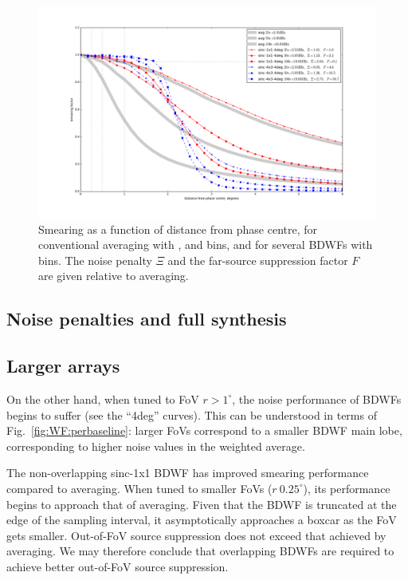\documentclass[useAMS,usenatbib]{mn2e}
\begin{document}
\begin{figure}
\includegraphics[width=\textwidth]{./Figures/suppression-25-100-sincs.png}
\caption{Smearing as a function of distance from phase centre, for conventional averaging with 
,  and  bins, and for several BDWFs with  bins.
The noise penalty $\Xi$ and the far-source suppression factor $F$ are given relative to 
averaging.}
\label{fig:results-3sincs}
\end{figure}





\subsection{Noise penalties and full synthesis}



\subsection{Larger arrays}




On the other hand, when tuned to FoV $r>1^\circ$, the noise performance of BDWFs begins to suffer (see the ``4deg'' 
curves). This can be understood in terms of Fig.~\ref{fig:WF:perbaseline}: larger FoVs correspond to a smaller BDWF 
main lobe, corresponding to higher noise values in the weighted average.

The non-overlapping sinc-1x1 BDWF has improved smearing performance compared to  averaging. When tuned
to smaller FoVs ($r~0.25^\circ$), its performance begins to approach that of averaging. Fiven that the BDWF is truncated 
at the edge of the sampling interval, it asymptotically approaches a boxcar as the FoV gets smaller. Out-of-FoV source
suppression does not exceed that achieved by  averaging. We may therefore conclude that overlapping BDWFs
are required to achieve better out-of-FoV source suppression.
\end{document}
